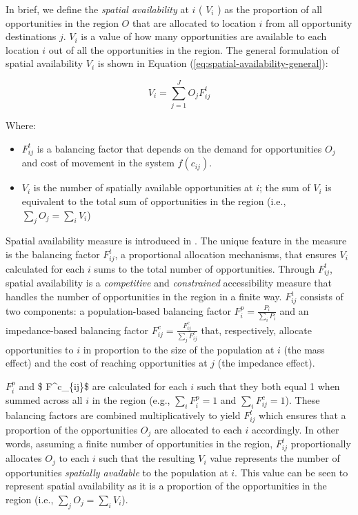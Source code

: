 \documentclass[]{trbunofficial}
\providecommand{\tightlist}{%
  \setlength{\itemsep}{0pt}\setlength{\parskip}{0pt}}
\begin{document}
In brief, we define the \emph{spatial availability} at \(i\) ( \(V_{i}\)
) as the proportion of all opportunities in the region \(O\) that are
allocated to location \(i\) from all opportunity destinations \(j\).
\(V_{i}\) is a value of how many opportunities are available to each
location \(i\) out of all the opportunities in the region. The general
formulation of spatial availability \(V_{i}\) is shown in Equation
(\ref{eq:spatial-availability-general}):

\begin{equation}
\label{eq:spatial-availability-general}
V_i = \sum_{j=1}^J O_jF^t_{ij}
\end{equation}

\noindent Where:

\begin{itemize}
\tightlist
\item
  \(F^t_{ij}\) is a balancing factor that depends on the demand for
  opportunities \(O_j\) and cost of movement in the system
  \(f(c_{ij})\).
\item
  \(V_i\) is the number of spatially available opportunities at \(i\);
  the sum of \(V_{i}\) is equivalent to the total sum of opportunities
  in the region (i.e., \(\sum_j O_j = \sum_i V_i\))
\end{itemize}

Spatial availability measure is introduced in
\citet{soukhovIntroducingSpatialAvailability2023}. The unique feature in
the measure is the balancing factor \(F^t_{ij}\), a proportional
allocation mechanisms, that ensures \(V_i\) calculated for each \(i\)
sums to the total number of opportunities. Through \(F^t_{ij}\), spatial
availability is a \emph{competitive} and \emph{constrained}
accessibility measure that handles the number of opportunities in the
region in a finite way. \(F^t_{ij}\) consists of two components: a
population-based balancing factor \(F^p_{i} = \frac{P_i}{\sum_i P_i}\)
and an impedance-based balancing factor
\(F^c_{ij} = \frac{F^c_{ij}}{\sum_j F^c_{ij}}\) that, respectively,
allocate opportunities to \(i\) in proportion to the size of the
population at \(i\) (the mass effect) and the cost of reaching
opportunities at \(j\) (the impedance effect).

\(F^p_{i}\) and \$ F\^{}c\_\{ij\}\$ are calculated for each \(i\) such
that they both equal 1 when summed across all \(i\) in the region (e.g.,
\(\sum_i F^p_{i} = 1\) and \(\sum_i F^c_{ij} = 1\)). These balancing
factors are combined multiplicatively to yield \(F^t_{ij}\) which
ensures that a proportion of the opportunities \(O_j\) are allocated to
each \(i\) accordingly. In other words, assuming a finite number of
opportunities in the region, \(F^t_{ij}\) proportionally allocates
\(O_j\) to each \(i\) such that the resulting \(V_i\) value represents
the number of opportunities \emph{spatially available} to the population
at \(i\). This value can be seen to represent spatial availability as it
is a proportion of the opportunities in the region (i.e.,
\(\sum_j O_j = \sum_i V_i\)).
\end{document}
